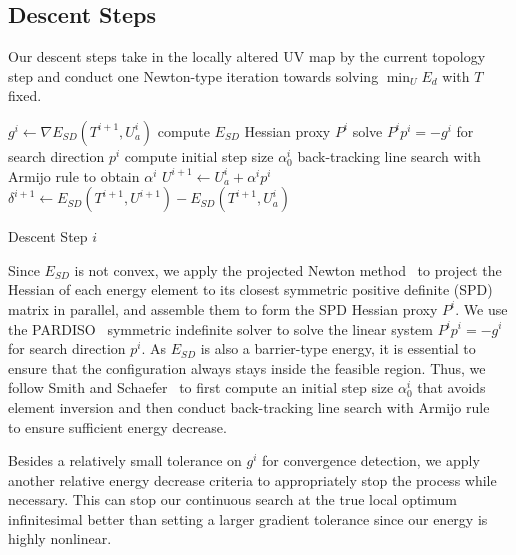 
\subsection{Descent Steps}
\label{sec:descentStep}

Our descent steps take in the locally altered UV map by the current topology step and conduct one Newton-type iteration towards solving $\min_U E_d$ with $T$ fixed.

\begin{algorithm}[h]
\SetAlgoLined
{}
$g^{i} \leftarrow \nabla E_{SD}(T^{i+1}, U_a^{i})$\;
compute $E_{SD}$ Hessian proxy $P^i$\;
solve $P^i p^i = -g^i$ for search direction $p^i$\;
compute initial step size $\alpha^i_0$\;
back-tracking line search with Armijo rule to obtain $\alpha^i$\;
$U^{i+1} \leftarrow U_a^i + \alpha^i p^i$\;
$\delta^{i+1} \leftarrow E_{SD}(T^{i+1}, U^{i+1}) - E_{SD}(T^{i+1}, U_a^{i})$\;
\caption{Descent Step $i$}
\label{alg:descentStep}
\end{algorithm}
Since $E_{SD}$ is not convex, we apply the projected Newton method~\cite{Teran2005Robust} to project the Hessian of each energy element to its closest symmetric positive definite (SPD) matrix in parallel, and assemble them to form the SPD Hessian proxy $P^i$. We use the PARDISO~\cite{pardiso-6.0a, pardiso-6.0b} symmetric indefinite solver to solve the linear system $P^i p^i = -g^i$ for search direction $p^i$.  As $E_{SD}$ is also a barrier-type energy, it is essential to ensure that the configuration always stays inside the feasible region. Thus, we follow Smith and Schaefer~ to first compute an initial step size $\alpha^i_0$ that avoids element inversion and then conduct back-tracking line search with Armijo rule~\cite{Armijo1966Minimization} to ensure sufficient energy decrease.

Besides a relatively small tolerance on $g^i$ for convergence detection, we apply another relative energy decrease criteria to appropriately stop the process while necessary.
This can stop our continuous search at the true local optimum infinitesimal better than setting a larger gradient tolerance since our energy is highly nonlinear. 

